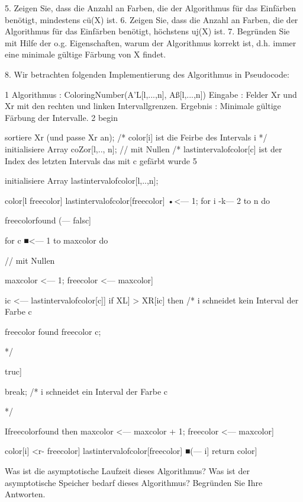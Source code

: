 \documentclass{lehramt-informatik}
\begin{document}
\begin{enumerate}
5. Zeigen Sie, dass die Anzahl an Farben, die der Algorithmus für das Einfärben benötigt,
mindestens cü(X) ist.
6. Zeigen Sie, dass die Anzahl an Farben, die der Algorithmus für das Einfärben benötigt,
höchstens uj(X) ist.
7. Begründen Sie mit Hilfe der o.g. Eigenschaften, warum der Algorithmus korrekt ist, d.h.
immer eine minimale gültige Färbung von X findet.

8. Wir betrachten folgenden Implementierung des Algorithmus in Pseudocode:

1 Algorithmus : ColoringNumber(A'L[l,...,n], Aß[l,...,n])
Eingabe : Felder Xr und Xr mit den rechten und linken Intervallgrenzen.
Ergebnis : Minimale gültige Färbung der Intervalle.
2 begin

sortiere Xr (und passe Xr an);
/* color[i] ist die Feirbe des Intervals i
*/
initialisiere Array coZor[l,.., n];
// mit Nullen
/* lastintervalofcolor[c] ist der Index des letzten Intervals das mit c gefärbt
wurde
5

initialisiere Array lastintervalofcolor[l,..,n];

color[l freecolor]
lastintervalofcolor[freecolor] •<— 1;
for i -k— 2 to n do

freecolorfound (— falsc]

for c ■<— 1 to maxcolor do

// mit Nullen

maxcolor <— 1;
freecolor <— maxcolor]

ic <— lastintervalofcolor[c]]
if XL] > XR[ic] then
/* i schneidet kein Interval der Farbe c

freecolor found
freecolor
c;

*/

truc]

break;
/* i schneidet ein Interval der Farbe c

*/

Ifreecolorfound then
maxcolor <— maxcolor + 1;
freecolor <— maxcolor]

color[i] <r- freecolor]
lastintervalofcolor[freecolor] ■(— i]
return color]

Was ist die asymptotische Laufzeit dieses Algorithmus? Was ist der asymptotische Speicher
bedarf dieses Algorithmus? Begründen Sie Ihre Antworten.

\end{enumerate}

\literatur
\end{document}
